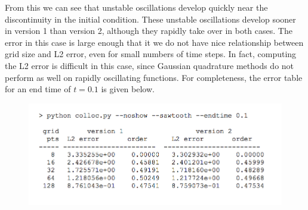 \documentclass[12pt]{article}
\begin{document}
From this we can see that unstable oscillations develop quickly near the discontinuity in the initial condition. These unstable oscillations develop sooner in version 1 than version 2, although they rapidly take over in both cases. The error in this case is large enough that it we do not have nice relationship between grid size and L2 error, even for small numbers of time steps. In fact, computing the L2 error is difficult in this case, since Gaussian quadrature methods do not perform as well on rapidly oscillating functions. For completeness, the error table for an end time of $t = 0.1$ is given below.

\begin{figure}[H]
\includegraphics[width=15cm]{images/colloc-output2.png}
\end{figure}
\end{document}
